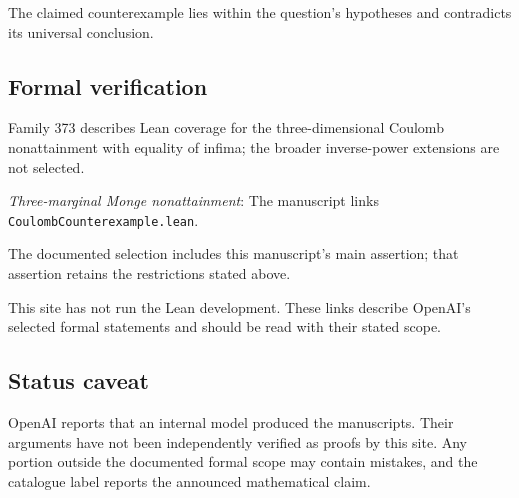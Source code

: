 \documentclass[11pt]{article}
\begin{document}
The claimed counterexample lies within the question’s hypotheses and contradicts its universal conclusion.

\subsection{Formal verification}
Family 373 describes Lean coverage for the three-dimensional Coulomb nonattainment with equality of infima; the broader inverse-power extensions are not selected.

\textit{Three-marginal Monge nonattainment}: The manuscript links \texttt{CoulombCounterexample.lean}.

The documented selection includes this manuscript’s main assertion; that assertion retains the restrictions stated above.

This site has not run the Lean development. These links describe OpenAI’s selected formal statements and should be read with their stated scope.

\subsection{Status caveat}
OpenAI reports that an internal model produced the manuscripts. Their arguments have not been independently verified as proofs by this site. Any portion outside the documented formal scope may contain mistakes, and the catalogue label reports the announced mathematical claim.
\end{document}
